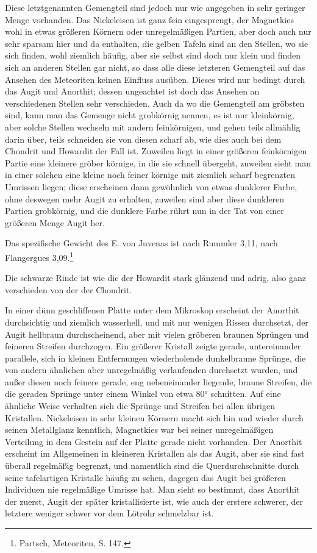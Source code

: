 \documentclass[a4paper, 11pt, oneside]{article}
\begin{document}
Diese letztgenannten Gemengteil sind jedoch nur wie angegeben in sehr geringer Menge vorhanden. Das Nickeleisen ist ganz fein eingesprengt, der Magnetkies wohl in etwas größeren Körnern oder unregelmäßigen Partien, aber doch auch nur sehr sparsam hier und da enthalten, die gelben Tafeln sind an den Stellen, wo sie sich finden, wohl ziemlich häufig, aber sie selbst sind doch nur klein und finden sich an anderen Stellen gar nicht, so dass alle diese letzteren Gemengteil auf das Ansehen des Meteoriten keinen Einfluss ausüben. Dieses wird nur bedingt durch das Augit und Anorthit; dessen ungeachtet ist doch das Ansehen an verschiedenen Stellen sehr verschieden. Auch da wo die Gemengteil am gröbsten sind, kann man das Gemenge nicht grobkörnig nennen, es ist nur kleinkörnig, aber solche Stellen wechseln mit andern feinkörnigen, und gehen teils allmählig darin über, teils schneiden sie von diesen scharf ab, wie dies auch bei dem Chondrit und Howardit der Fall ist. Zuweilen liegt in einer größeren feinkörnigen Partie eine kleinere gröber körnige, in die sie schnell übergeht, zuweilen sieht man in einer solchen eine kleine noch feiner körnige mit ziemlich scharf begrenzten Umrissen liegen; diese erscheinen dann gewöhnlich von etwas dunklerer Farbe, ohne deswegen mehr Augit zu erhalten, zuweilen sind aber diese dunkleren Partien grobkörnig, und die dunklere Farbe rührt nun in der Tat von einer größeren Menge Augit her.

Das spezifische Gewicht des E. von Juvenas ist nach Rummler 3,11, nach Flangergues 3,09.\footnote{Partsch, Meteoriten, S. 147.}

Die schwarze Rinde ist wie die der Howardit stark glänzend und adrig, also ganz verschieden von der der Chondrit.

In einer dünn geschliffenen Platte unter dem Mikroskop erscheint der Anorthit durchsichtig und ziemlich wasserhell, und mit nur wenigen Rissen durchsetzt, der Augit hellbraun durchscheinend, aber mit vielen gröberen braunen Sprüngen und feineren Streifen durchzogen. Ein größerer Kristall zeigte gerade, untereinander parallele, sich in kleinen Entfernungen wiederholende dunkelbraune Sprünge, die von andern ähnlichen aber unregelmäßig verlaufenden durchsetzt wurden, und außer diesen noch feinere gerade, eng nebeneinander liegende, braune Streifen, die die geraden Sprünge unter einem Winkel von etwa 80° schnitten. Auf eine ähnliche Weise verhalten sich die Sprünge und Streifen bei allen übrigen Kristallen. Nickeleisen in sehr kleinen Körnern macht sich hin und wieder durch seinen Metallglanz kenntlich, Magnetkies war bei seiner unregelmäßigen Verteilung in dem Gestein auf der Platte gerade nicht vorhanden. Der Anorthit erscheint im Allgemeinen in kleineren Kristallen als das Augit, aber sie sind fast überall regelmäßig begrenzt, und namentlich sind die Querdurchschnitte durch seine tafelartigen Kristalle häufig zu sehen, dagegen das Augit bei größeren Individuen nie regelmäßige Umrisse hat. Man sieht so bestimmt, dass Anorthit der zuerst, Augit der später kristallisierte ist, wie auch der erstere schwerer, der letztere weniger schwer vor dem Lötrohr schmelzbar ist.
\end{document}
